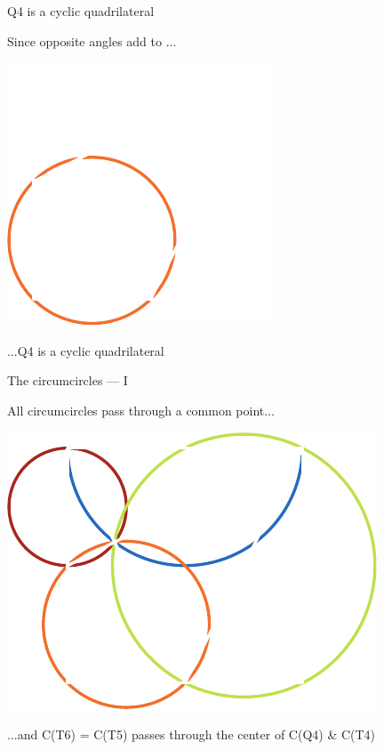 \documentclass[14pt]{beamer}
\begin{document}

    \begin{frame}{Q4 is a cyclic quadrilateral}
        \begin{center}
            Since opposite angles add to \textpi...
        \end{center}
        \vspace{0.90em}
        \hspace{5.25em} \includegraphics[scale=1.]{figures/figure019b.pdf} \\
        \begin{center}
            ...Q4 is a cyclic quadrilateral
        \end{center}
    \end{frame}


    \begin{frame}{The circumcircles --- I}
        \begin{center}
            All circumcircles pass through a common point...
        \end{center}
        \hspace{3.92em} \includegraphics[scale=1.0]{figures/figure019c.pdf} \\
        \begin{center}
            \footnotesize ...and C(T6) = C(T5) passes through the center of C(Q4) \& C(T4)
        \end{center}
    \end{frame}
\end{document}
